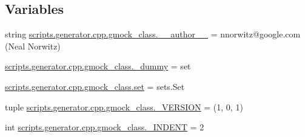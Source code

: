 \subsection*{Variables}
\begin{DoxyCompactItemize}
\item 
string \mbox{\hyperlink{namespacescripts_1_1generator_1_1cpp_1_1gmock__class_ae1b56ce99653dddc0c91337c59f0b135}{scripts.\+generator.\+cpp.\+gmock\+\_\+class.\+\_\+\+\_\+author\+\_\+\+\_\+}} = \textquotesingle{}nnorwitz@google.\+com (Neal Norwitz)\textquotesingle{}
\item 
\mbox{\hyperlink{namespacescripts_1_1generator_1_1cpp_1_1gmock__class_a4ba021ade0bbf1ab85eaf7599ceed0fb}{scripts.\+generator.\+cpp.\+gmock\+\_\+class.\+\_\+dummy}} = set
\item 
\mbox{\hyperlink{namespacescripts_1_1generator_1_1cpp_1_1gmock__class_a386c2961f37ce94d75917df65b2b9f1d}{scripts.\+generator.\+cpp.\+gmock\+\_\+class.\+set}} = sets.\+Set
\item 
tuple \mbox{\hyperlink{namespacescripts_1_1generator_1_1cpp_1_1gmock__class_a9d64018872dac32a5565c95821754c65}{scripts.\+generator.\+cpp.\+gmock\+\_\+class.\+\_\+\+V\+E\+R\+S\+I\+ON}} = (1, 0, 1)
\item 
int \mbox{\hyperlink{namespacescripts_1_1generator_1_1cpp_1_1gmock__class_a89d748ae591fb1739fc9ddff2d30c3f7}{scripts.\+generator.\+cpp.\+gmock\+\_\+class.\+\_\+\+I\+N\+D\+E\+NT}} = 2
\end{DoxyCompactItemize}
